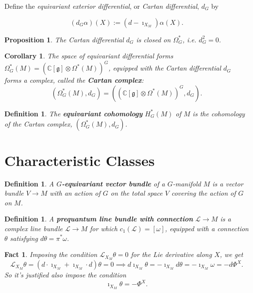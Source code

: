 \documentclass{article}
\newtheorem{prop}[theorem]{Proposition}
\newtheorem{corollary}[theorem]{Corollary}
\newtheorem{defn}[theorem]{Definition\rm}
\newtheorem{fact}{Fact}
\newcommand{\ie}{\emph{i.e.} }
\newcommand{\ra}{\rightarrow}
\newcommand{\w}{\omega}
\newcommand{\W}{\Omega}
\newcommand{\CC}{\mathbb{C}}
\newcommand{\mcL}{\mathcal{L}}
\newcommand{\mfg}{\mathfrak{g}}
\begin{document}
Define the \emph{equivariant exterior differential}, or \emph{Cartan differential}, $d_{G}$ by

\begin{equation*}
	(d_{G}\alpha)(X) := (d - \imath_{X_{M}}) \alpha(X).
\end{equation*}

\begin{prop}
	The Cartan differential $d_{G}$ is closed on $\W_{G}^{\ast}$, \ie $d_{G}^{2} = 0$.
\end{prop}

\begin{corollary}
	The space of equivariant differential forms $\W_{G}^{\ast}(M) = \left( \CC[\mfg] \otimes \W^{\ast}(M) \right)^{G}$, equipped with the Cartan differential $d_{G}$ forms a complex, called the \textbf{Cartan complex}:
	\begin{equation*}
		\left( \W_{G}^{\ast}(M), d_{G} \right) = \left( (\CC[\mfg] \otimes \W^{\ast}(M)   )^{G}, d_{G} \right).
	\end{equation*}

\end{corollary}

\begin{defn}
	The \textbf{equivariant cohomology} $H_{G}^{\ast}(M)$ of $M$ is the cohomology of the Cartan complex, $(\W_{G}^{\ast}(M), d_{G})$.
\end{defn}





\section{Characteristic Classes}

\begin{defn}
	A $G$\textbf{-equivariant vector bundle} of a $G$-manifold $M$ is a vector bundle $V \ra M$ with an action of $G$ on the total space $V$ covering the action of $G$ on $M$.
\end{defn}

\begin{defn}
	A \textbf{prequantum line bundle with connection} $\mcL \ra M$ is a complex line bundle $\mcL \ra M$ for which $c_{1}(\mcL) = [\w]$, equipped with a connection $\theta$ satisfying $d\theta = \pi^{\ast}\w$.
\end{defn}

\begin{fact}
	Imposing the condition $\mcL_{X_{M}}\theta = 0$ for the Lie derivative along $X$, we get
	\begin{equation*}
		\mcL_{X_{M}} \theta = (d\cdot\imath_{X_{M}} + \imath_{X_{M}} \cdot d) \theta = 0 \implies d \imath_{X_{M}} \theta = -\imath_{X_{M}}d\theta = -  \imath_{X_{M}}\w = - d\Phi^{X}.
	\end{equation*}
	So it's justified also impose the condition
	\begin{equation*}
		\imath_{X_{M}}\theta = - \Phi^{X}.
	\end{equation*}
\end{fact}
\end{document}
